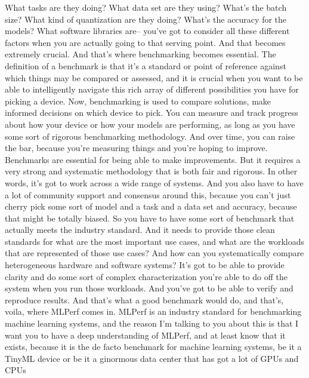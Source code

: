 {{{{{{{    What tasks are they doing?
    What data set are they using?
    What's the batch size?
    What kind of quantization are they doing?
    What's the accuracy for the models?
    What software libraries are--
    you've got to consider all these different factors when you are actually
    going to that serving point.
    And that becomes extremely crucial.
    And that's where benchmarking becomes essential.
    The definition of a benchmark is that it's a standard or point of reference
    against which things may be compared or assessed,
    and it is crucial when you want to be able to intelligently navigate
    this rich array of different possibilities
    you have for picking a device.
    Now, benchmarking is used to compare solutions,
    make informed decisions on which device to pick.
    You can measure and track progress about how your device
    or how your models are performing, as long
    as you have some sort of rigorous benchmarking methodology.
    And over time, you can raise the bar, because you're measuring things
    and you're hoping to improve.
    Benchmarks are essential for being able to make improvements.
    But it requires a very strong and systematic methodology
    that is both fair and rigorous.
    In other words, it's got to work across a wide range of systems.
    And you also have to have a lot of community support and consensus
    around this, because you can't just cherry pick some sort of model
    and a task and a data set and accuracy, because that might be totally biased.
    So you have to have some sort of benchmark that
    actually meets the industry standard.
    And it needs to provide those clean standards
    for what are the most important use cases,
    and what are the workloads that are represented of those use cases?
    And how can you systematically compare heterogeneous hardware and software
    systems?
    It's got to be able to provide clarity and do
    some sort of complex characterization you're able to do off the system
    when you run those workloads.
    And you've got to be able to verify and reproduce results.
    And that's what a good benchmark would do,
    and that's, voila, where MLPerf comes in.
    MLPerf is an industry standard for benchmarking machine learning systems,
    and the reason I'm talking to you about this
    is that I want you to have a deep understanding of MLPerf,
    and at least know that it exists, because it
    is the de facto benchmark for machine learning systems, be it a TinyML device
    or be it a ginormous data center that has got a lot of GPUs and CPUs
}}}}}}}
